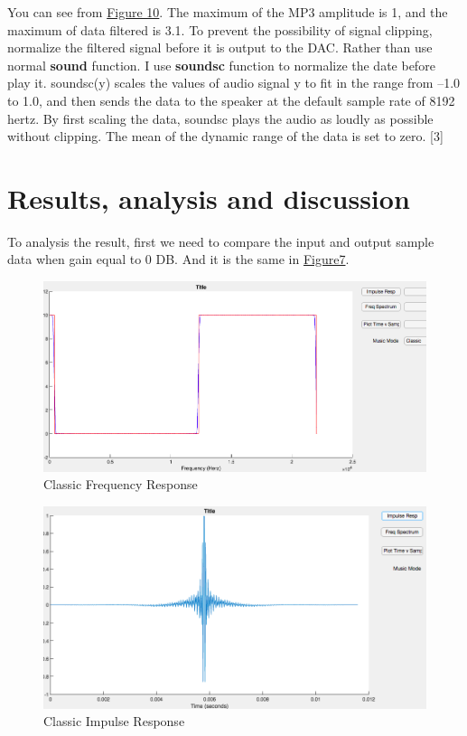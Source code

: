\documentclass[titlepage]{article}
\begin{document}
You can see from \hyperref[fig:org3c5c511]{Figure 10}. The maximum of the MP3 amplitude is 1, and the
maximum of data filtered is 3.1. To prevent the possibility of signal clipping,
normalize the filtered signal before it is output to the DAC. Rather than use
normal \textbf{sound} function. I use \textbf{soundsc} function to normalize the date before
play it. soundsc(y) scales the values of audio signal y to fit in the range from
–1.0 to 1.0, and then sends the data to the speaker at the default sample rate
of 8192 hertz. By first scaling the data, soundsc plays the audio as loudly as
possible without clipping. The mean of the dynamic range of the data is set to
zero. [3]

\section{Results, analysis and discussion}
\label{sec:orgd9f12fc}
To analysis the result, first we need to compare the input and output sample data
when gain equal to 0 DB. And it is the same in \hyperref[fig:org2a0d4f2]{Figure7}.
\begin{figure}[htbp]
\caption{\label{fig:org74f4b11}
Classic Frequency Response}
\centering
\includegraphics[width=12cm]{./img/10.png}
\end{figure}

\begin{figure}[htbp]
\caption{\label{fig:org7951797}
Classic Impulse Response}
\centering
\includegraphics[width=12cm]{./img/11.png}
\end{figure}
\end{document}
